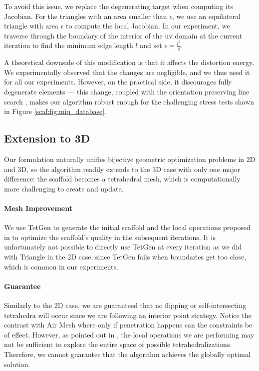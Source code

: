 To avoid this issue, we replace the degenerating target {when computing its} Jacobian. For the triangles with an area smaller th{an $\epsilon$, we use an equilateral triangle with area $\epsilon$ to compute the local Jacobian.} {In our experiment,} we traverse through the boundary of the interior of the uv domain at the current iteration to find the minimum edge length $l$ {and set} $\epsilon = \frac{l^2}{4}$.

A theoretical downside of this modification {is that} it affects the distortion energy. We experimentally observed that the changes are negligible, and we thus used it for all our experiments. {However, on the practical side}, it discourages fully degenerate elements --- this change, coupled with the orientation preserving line search \cite{Smith:2015}, makes our algorithm robust {enough for the challenging stress tests shown in} Figure \ref{scaf:fig:miq_database}.

\subsection{Extension to 3D}

{Our formulation naturally unifies bijective geometric optimization problems in 2D and 3D, so the} algorithm readily extends to the 3D case with only one major difference: the scaffold becomes a tetrahedral mesh, which is computationally more challenging to create and update.
\paragraph{{Mesh Improvement}}
We use TetGen \cite{tetgen} to generate the initial scaffold and the local operations proposed in \cite{Klingner:2009} to optimize the scaffold's quality in the subsequent iterations. 
%
It is unfortunately not possible to directly use TetGen at every iteration as we did with Triangle in the 2D case, since TetGen fails when boundaries get too close, which is common in our experiments.

{
\paragraph{Guarantee} Similarly to the 2D case, we are guaranteed that no flipping or self-intersecting tetrahedra will occur since we are following an interior point strategy. Notice the contrast with Air Mesh \cite{Muller:2015} where only if penetration happens can the constraints be of effect. However, as pointed out in \cite{Dougherty2004}, the local operations we are performing may not be sufficient to explore the entire space of possible tetrahedralizations. %
Therefore, we cannot guarantee that the algorithm achieves the globally optimal solution.
}